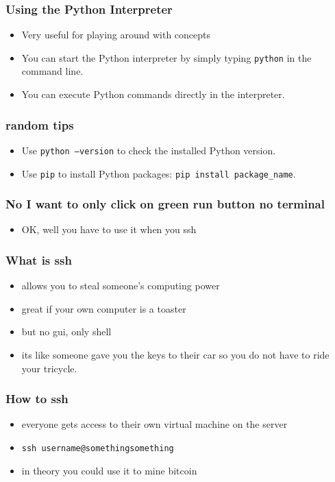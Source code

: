 \documentclass[aspectratio=169,hyperref={unicode}]{beamer}
\begin{document}
\begin{frame}[fragile]
\frametitle{Using the Python Interpreter}
\begin{itemize}
        \item Very useful for playing around with concepts
\item You can start the Python interpreter by simply typing \texttt{python} in the command line.
\item You can execute Python commands directly in the interpreter.
\end{itemize}
\end{frame}

\begin{frame}
\frametitle{random tips}
\begin{itemize}
\item Use \texttt{python --version} to check the installed Python version.
\item Use \texttt{pip} to install Python packages: \texttt{pip install package\_name}.
\end{itemize}
\end{frame}


\begin{frame}
\frametitle{No I want to only click on green run button no terminal}
\begin{itemize}
\item OK, well you have to use it when you ssh
\end{itemize}
\end{frame}

\begin{frame}
\frametitle{What is ssh}
\begin{itemize}
\item allows you to steal someone's computing power
\item great if your own computer is a toaster
\item but no gui, only shell
\item its like someone gave you the keys to their car so you do not have to ride your tricycle.
\end{itemize}
\end{frame}

\begin{frame}
\frametitle{How to ssh}
\begin{itemize}
\item everyone gets access to their own virtual machine on the server
\item \texttt{ssh username@somethingsomething}
\item in theory you could use it to mine bitcoin
\end{itemize}
\end{frame}
\end{document}
